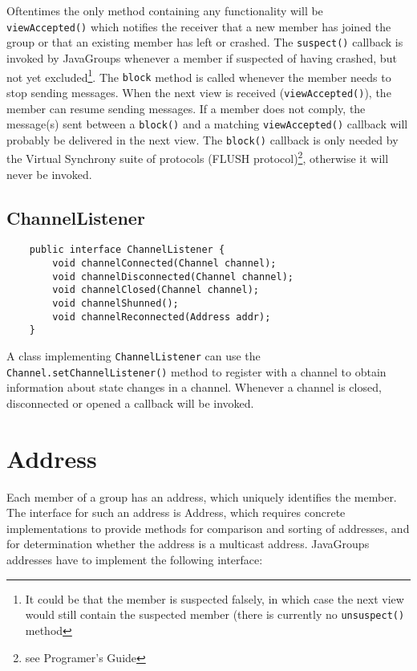     Oftentimes the only method containing any functionality will be {\tt
    viewAccepted()} which notifies the receiver that a new member has joined the
    group or that an existing member has left or crashed. The {\tt suspect()}
    callback is invoked by JavaGroups whenever a member if suspected of having
    crashed, but not yet excluded\footnote{It could be that the member is suspected
    falsely, in which case the next view would still contain the suspected member
    (there is currently no {\tt unsuspect()} method}. The {\tt block} method is
    called whenever the member needs to stop sending messages. When the next view is
    received ({\tt viewAccepted()}), the member can resume sending messages. If a
    member does not comply, the message(s) sent between a {\tt block()} and a
    matching {\tt viewAccepted()} callback will probably be delivered in the next
    view. The {\tt block()} callback is only needed by the Virtual Synchrony suite of
    protocols (FLUSH protocol)\footnote{see Programer's Guide}, otherwise it will
    never be invoked.


    \subsection{ChannelListener}

    \begin{small}
    \begin{verbatim}
    public interface ChannelListener {
        void channelConnected(Channel channel);
        void channelDisconnected(Channel channel);
        void channelClosed(Channel channel);
        void channelShunned();
        void channelReconnected(Address addr);
    }
    \end{verbatim}
    \end{small}

    A class implementing {\tt ChannelListener} can use the {\tt
    Channel.setChannelListener()} method to register with a channel to obtain
    information about state changes in a channel. Whenever a channel is closed,
    disconnected or opened a callback will be invoked.




  \section{Address}

  Each member of a group has an address, which uniquely identifies the member. The
  interface for such an address is Address, which requires concrete implementations
  to provide methods for comparison and sorting of addresses, and for determination
  whether the address is a multicast address. JavaGroups addresses have to implement
  the following interface:

